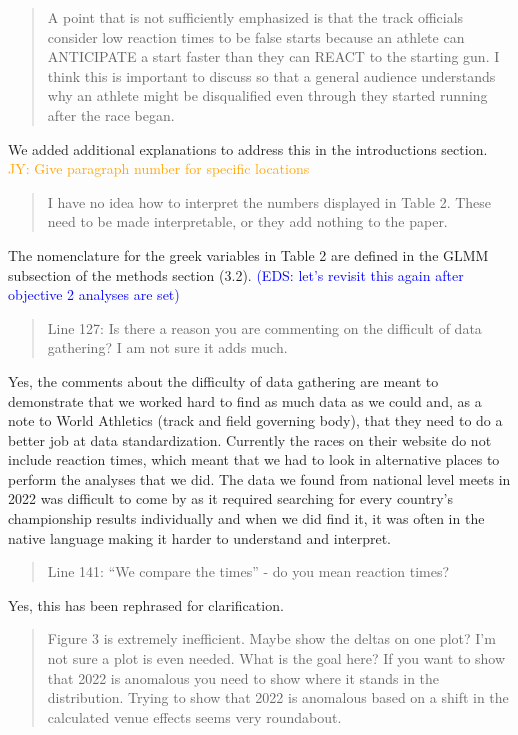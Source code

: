 \documentclass[12pt]{article}
\newcommand{\jy}[1]{\textcolor{orange}{JY: #1}}
\newcommand{\eds}[1]{\textcolor{blue}{(EDS: #1)}}
\newenvironment{comment}%
{\begin{quotation}\noindent\small\it\color{darkblue}\ignorespaces%
}{\end{quotation}}
\begin{document}
\begin{comment}
A point that is not sufficiently emphasized is that the track officials consider
low reaction times to be false starts because an athlete can ANTICIPATE a start
faster than they can REACT to the starting gun. I think this is important to
discuss so that a general audience understands why an athlete might be
disqualified even through they started running after the race began.  
\end{comment}

We added additional explanations to address this in the introductions section.
\jy{Give paragraph number for specific locations}

\begin{comment}
I have no idea how to interpret the numbers displayed in Table 2. These
need to be made interpretable, or they add nothing to the paper.
\end{comment}

The nomenclature for the greek variables in Table 2 are defined in the GLMM
subsection of the methods section (3.2).
\eds{let's revisit this again after objective 2 analyses are set}

\begin{comment}
Line 127: Is there a reason you are commenting on the difficult of data
gathering? I am not sure it adds much.
\end{comment}

Yes, the comments about the difficulty of data gathering are meant to demonstrate
that we worked hard to find as much data as we could and, as a note to World
Athletics (track and field governing body), that they need to do a better job
at data standardization.  Currently the races on their website do not include
reaction times, which meant that we had to look in alternative places to perform
the analyses that we did.  The data we found from national level meets in 2022
was difficult to come by as it required searching for every country's championship
results individually and when we did find it, it was often in the native language
making it harder to understand and interpret.

\begin{comment}
Line 141: “We compare the times” - do you mean reaction times?
\end{comment}

Yes, this has been rephrased for clarification.

\begin{comment}
Figure 3 is extremely inefficient. Maybe show the deltas on one plot? I'm not
sure a plot is even needed. What is the goal here? If you want to show that 2022
is anomalous you need to show where it stands in the distribution. Trying to
show that 2022 is anomalous based on a shift in the calculated venue effects
seems very roundabout.
\end{comment}
\end{document}
